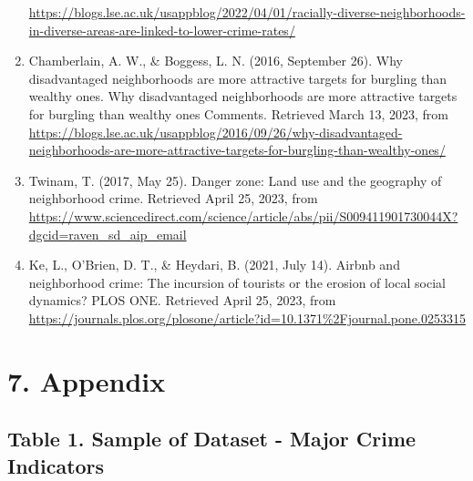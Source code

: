 \documentclass[
]{article}
\begin{document}
\begin{enumerate}
  \url{https://blogs.lse.ac.uk/usappblog/2022/04/01/racially-diverse-neighborhoods-in-diverse-areas-are-linked-to-lower-crime-rates/}
\item
  Chamberlain, A. W., \& Boggess, L. N. (2016, September 26). Why
  disadvantaged neighborhoods are more attractive targets for burgling
  than wealthy ones. Why disadvantaged neighborhoods are more attractive
  targets for burgling than wealthy ones Comments. Retrieved March 13,
  2023, from
  \url{https://blogs.lse.ac.uk/usappblog/2016/09/26/why-disadvantaged-neighborhoods-are-more-attractive-targets-for-burgling-than-wealthy-ones/}
\item
  Twinam, T. (2017, May 25). Danger zone: Land use and the geography of
  neighborhood crime. Retrieved April 25, 2023, from
  \url{https://www.sciencedirect.com/science/article/abs/pii/S009411901730044X?dgcid=raven_sd_aip_email}
\item
  Ke, L., O'Brien, D. T., \& Heydari, B. (2021, July 14). Airbnb and
  neighborhood crime: The incursion of tourists or the erosion of local
  social dynamics? PLOS ONE. Retrieved April 25, 2023, from
  \url{https://journals.plos.org/plosone/article?id=10.1371\%2Fjournal.pone.0253315}
\end{enumerate}

\hypertarget{appendix}{%
\section{7. Appendix}\label{appendix}}

\hypertarget{table-1.-sample-of-dataset---major-crime-indicators}{%
\subsection{Table 1. Sample of Dataset - Major Crime
Indicators}\label{table-1.-sample-of-dataset---major-crime-indicators}}
\end{document}
